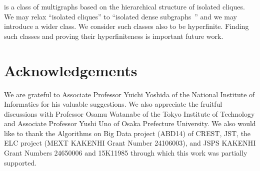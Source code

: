 \documentclass[11pt]{article}
\begin{document}
 is a class of multigraphs based on the hierarchical structure of isolated cliques.  
We may relax ``isolated cliques'' to ``isolated dense subgraphs~\cite{IsoClique_TALG09}''
and we may introduce a wider class.  
We consider such classes also to be hyperfinite.  
Finding such classes and proving their hyperfiniteness is important future work.  

 
 




























\section*{Acknowledgements}
We are grateful to Associate Professor Yuichi Yoshida of 
the National Institute of Informatics for his valuable suggestions. 
We also appreciate the fruitful discussions with Professor Osamu Watanabe of the Tokyo Institute of Technology and Associate Professor Yushi Uno of Osaka Prefecture University. 
We also would like to thank the Algorithms on Big Data project (ABD14) of CREST, JST, 
the ELC project (MEXT KAKENHI Grant Number 24106003), and JSPS KAKENHI Grant Numbers 24650006 and 15K11985 through which this work was partially supported. 
\end{document}
